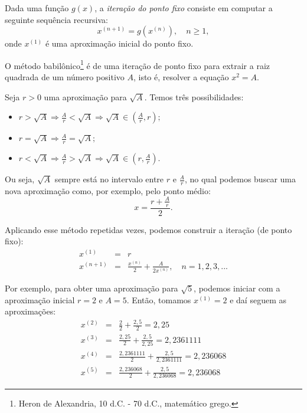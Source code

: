 \begin{ex}
Dada uma função $g(x)$, a \emph{iteração do ponto fixo} consiste em computar a seguinte sequência recursiva:
\begin{equation}
  x^{(n+1)} = g(x^{(n)}), \quad n\geq 1,
\end{equation}
onde $x^{(1)}$ é uma aproximação inicial do ponto fixo.

\begin{ex}
O método babilônico\footnote{Heron de Alexandria, 10 d.C. - 70 d.C., matemático grego.} é de uma iteração de ponto fixo para extrair a raiz quadrada de um número positivo $A$, isto é, resolver a equação $x^2 = A$.

Seja $r>0$ uma aproximação para $\sqrt{A}$. Temos três possibilidades:
\begin{itemize}
\item $r>\sqrt{A} \Longrightarrow \frac{A}{r}<\sqrt{A} \Longrightarrow \sqrt{A}\in \left(\frac{A}{r}, r\right);$
\item $r=\sqrt{A} \Longrightarrow \frac{A}{r}=\sqrt{A};$
\item $r<\sqrt{A} \Longrightarrow \frac{A}{r}>\sqrt{A} \Longrightarrow \sqrt{A}\in \left(r, \frac{A}{r}\right).$
\end{itemize}
Ou seja, $\sqrt{A}$ sempre está no intervalo entre $r$ e $\frac{A}{r}$, no qual podemos buscar uma nova aproximação como, por exemplo, pelo ponto médio:
\begin{equation} x=\frac{r+\frac{A}{r}}{2}. \end{equation}

Aplicando esse método repetidas vezes, podemos construir a iteração (de ponto fixo):
\begin{eqnarray}
x^{(1)}&=&r \\
x^{(n+1)}&=&\frac{x^{(n)}}{2}+\frac{A}{2x^{(n)}}, \quad n=1,2,3,...
\end{eqnarray}

Por exemplo, para obter uma aproximação para $\sqrt{5}$, podemos iniciar com a aproximação inicial $r=2$ e $A=5$. Então, tomamos $x^{(1)} = 2$ e daí seguem as aproximações:
\begin{eqnarray}
x^{(2)}&=&\frac{2}{2}+\frac{2,5}{2} = 2,25\\
x^{(3)}&=&\frac{2,25}{2}+\frac{2,5}{2,25}= 2,2361111  \\
x^{(4)}&=&\frac{2,2361111}{2}+\frac{2,5}{2,2361111}= 2,236068  \\
x^{(5)}&=&\frac{2,236068}{2}+\frac{2,5}{2,236068}= 2,236068
\end{eqnarray}
\end{ex}


\end{ex}
